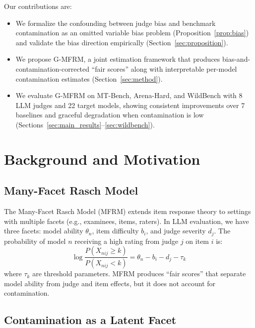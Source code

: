 \documentclass[11pt]{article}
\begin{document}
Our contributions are:
\begin{itemize}
    \item We formalize the confounding between judge bias and benchmark contamination as an omitted variable bias problem (Proposition~\ref{prop:bias}) and validate the bias direction empirically (Section~\ref{sec:proposition}).
    \item We propose G-MFRM, a joint estimation framework that produces bias-and-contamination-corrected ``fair scores'' along with interpretable per-model contamination estimates (Section~\ref{sec:method}).
    \item We evaluate G-MFRM on MT-Bench, Arena-Hard, and WildBench with 8 LLM judges and 22 target models, showing consistent improvements over 7 baselines and graceful degradation when contamination is low (Sections~\ref{sec:main_results}--\ref{sec:wildbench}).
\end{itemize}

\section{Background and Motivation}
\label{sec:background}

\subsection{Many-Facet Rasch Model}

The Many-Facet Rasch Model (MFRM) \citep{linacre1989mfrm} extends item response theory to settings with multiple facets (e.g., examinees, items, raters). In LLM evaluation, we have three facets: model ability $\theta_n$, item difficulty $b_i$, and judge severity $d_j$. The probability of model $n$ receiving a high rating from judge $j$ on item $i$ is:
\begin{equation}
\label{eq:mfrm}
\log \frac{P(X_{nij} \geq k)}{P(X_{nij} < k)} = \theta_n - b_i - d_j - \tau_k
\end{equation}
where $\tau_k$ are threshold parameters. MFRM produces ``fair scores'' that separate model ability from judge and item effects, but it does not account for contamination.

\subsection{Contamination as a Latent Facet}
\end{document}
